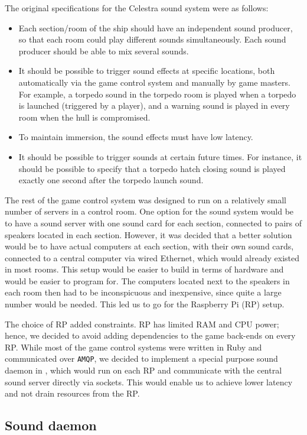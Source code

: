 The original specifications for the Celestra sound system were as follows:
\begin{itemize}
\item Each section/room of the ship should have an independent sound producer, so that each room could play different sounds simultaneously. Each sound producer should be able to mix several sounds.
\item It should be possible to trigger sound effects at specific
  locations, both automatically via the game control system and
  manually by game masters. For example, a torpedo sound in the
  torpedo room is played when a torpedo is launched (triggered by a player), and
  a warning sound is played in every room when the hull is compromised.
\item To maintain immersion, the sound effects must have low latency.
\item It should be possible to trigger sounds at certain future times. For instance, it should be possible to specify that a torpedo hatch closing sound is played exactly one second after the torpedo launch sound.
\end{itemize}

The rest of the game control system was designed to run on a
relatively small number of servers in a control room. One
option for the sound system would be to have a sound server with one
sound card for each section, connected to pairs of speakers located
in each section. However, it was decided that a better solution would
be to have actual computers at each section, with their own sound
cards, connected to a central computer via wired Ethernet, which would
already existed in most rooms. This setup would be easier to build in
terms of hardware and would be easier to program for. The computers
located next to the speakers in each room then had to be inconspicuous
and inexpensive, since quite a large number would be needed. This led us to go
for the Raspberry Pi (RP) setup.

The choice of RP added constraints. RP has limited RAM and CPU power;
hence, we decided to avoid adding dependencies to the game back-ends on
every RP\@. While most of the game control systems were written in Ruby
and communicated over \texttt{AMQP}, we decided to implement a
special purpose sound daemon in \Cpp, which would run on each RP and
communicate with the central sound server directly via sockets. This
would enable us to achieve lower latency and not drain resources from
the RP\@.

\subsection{Sound daemon}

